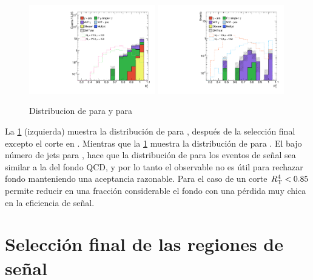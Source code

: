 

\begin{figure}[!h]
  \centering

  \includegraphics[width=0.49\textwidth]{figures/rt4_srl}
  \includegraphics[width=0.49\textwidth]{figures/rt2_srh}

  \caption{Distribucion de {\rt} para {\SRL} y {\rtt} para {\SRH}}
  \label{fig:opt_rt}
\end{figure}

La \cref{fig:opt_rt} (izquierda) muestra la distribución de {\rtt} para {\SRH},
después de la selección final excepto el corte en {\rtt}. Mientras que la
\cref{fig:opt_rt} muestra la distribución de {\rt} para {\SRL}. El bajo número
de jets para {\SRH}, hace que la distribución de {\rtt} para los eventos de
señal sea similar a la del fondo QCD, y por lo tanto el observable no es útil
para rechazar fondo manteniendo una aceptancia razonable. Para el caso de {\SRL}
un corte $R_{\mathrm{T}}^{4} < 0.85$ permite reducir en una fracción considerable el fondo con
una pérdida muy chica en la eficiencia de señal.



\section{Selección final de las regiones de se\~nal}\label{sec:signal_regions}

